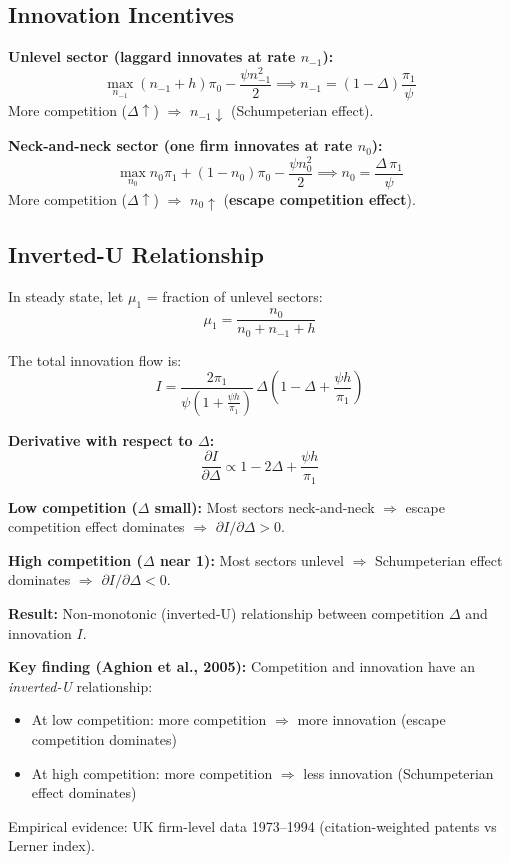 \documentclass[a4paper,11pt]{article}
\begin{document}
\subsection*{Innovation Incentives}

\textbf{Unlevel sector (laggard innovates at rate $n_{-1}$):}
\[
\max_{n_{-1}} (n_{-1} + h)\pi_0 - \frac{\psi n_{-1}^2}{2} \implies n_{-1} = (1-\Delta)\frac{\pi_1}{\psi}
\]
More competition ($\Delta \uparrow$) $\Rightarrow$ $n_{-1} \downarrow$ (Schumpeterian effect).

\textbf{Neck-and-neck sector (one firm innovates at rate $n_0$):}
\[
\max_{n_0} n_0 \pi_1 + (1-n_0)\pi_0 - \frac{\psi n_0^2}{2} \implies n_0 = \frac{\Delta\,\pi_1}{\psi}
\]
More competition ($\Delta \uparrow$) $\Rightarrow$ $n_0 \uparrow$ (\textbf{escape competition effect}).

\subsection*{Inverted-U Relationship}

In steady state, let $\mu_1$ = fraction of unlevel sectors:
\[
\mu_1 = \frac{n_0}{n_0 + n_{-1} + h}
\]

The total innovation flow is:
\[
I = \frac{2\pi_1}{\psi\!\left(1 + \frac{\psi h}{\pi_1}\right)} \,\Delta\!\left(1 - \Delta + \frac{\psi h}{\pi_1}\right)
\]

\begin{derivationbox}[title={Why the Inverted-U Shape?}]
\textbf{Derivative with respect to $\Delta$:}
\[
\frac{\partial I}{\partial \Delta} \propto 1 - 2\Delta + \frac{\psi h}{\pi_1}
\]

\textbf{Low competition ($\Delta$ small):} Most sectors neck-and-neck $\Rightarrow$ escape competition effect dominates $\Rightarrow$ $\partial I / \partial \Delta > 0$.

\textbf{High competition ($\Delta$ near 1):} Most sectors unlevel $\Rightarrow$ Schumpeterian effect dominates $\Rightarrow$ $\partial I / \partial \Delta < 0$.

\textbf{Result:} Non-monotonic (inverted-U) relationship between competition $\Delta$ and innovation $I$.
\end{derivationbox}

\begin{resultbox}
\textbf{Key finding (Aghion et al., 2005):} Competition and innovation have an \emph{inverted-U} relationship:
\begin{itemize}
    \item At low competition: more competition $\Rightarrow$ more innovation (escape competition dominates)
    \item At high competition: more competition $\Rightarrow$ less innovation (Schumpeterian effect dominates)
\end{itemize}
Empirical evidence: UK firm-level data 1973--1994 (citation-weighted patents vs Lerner index).
\end{resultbox}
\end{document}
